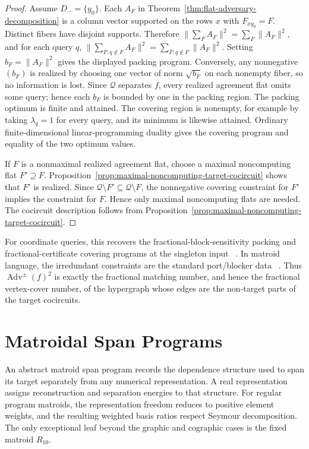\documentclass[11pt]{article}
\numberwithin{equation}{section}
\theoremstyle{remark}
\begin{document}
\begin{proof}
Assume \(D_-=\{y_0\}\).  Each \(A_F\) in
Theorem~\ref{thm:flat-adversary-decomposition} is a column vector supported
on the rows \(x\) with \(F_{x y_0}=F\).  Distinct fibers have disjoint supports. Therefore $\|\sum_FA_F\|^2=\sum_F\|A_F\|^2$, and for each query $q$, $\|\sum_{F:q\notin F}A_F\|^2=\sum_{F:q\notin F}\|A_F\|^2$. Setting $b_F=\|A_F\|^2$ gives the displayed packing program.  Conversely,
any nonnegative $(b_F)$ is realized by choosing one vector of norm
$\sqrt{b_F}$ on each nonempty fiber, so no information is lost.  Since
$\mathcal Q$ separates $f$, every realized agreement flat omits some query;
hence each $b_F$ is bounded by one in the packing region.  The packing optimum
is finite and attained.  The covering region is nonempty, for
example by taking $\lambda_q=1$ for every query, and its minimum is likewise
attained.  Ordinary finite-dimensional linear-programming duality gives the
covering program and equality of the two optimum values.

If \(F\) is a nonmaximal realized agreement flat, choose a maximal
noncomputing flat \(F'\supseteq F\).  Proposition~\ref{prop:maximal-noncomputing-target-cocircuit}
shows that \(F'\) is realized.  Since
\(\mathcal Q\setminus F'\subseteq\mathcal Q\setminus F\), the nonnegative
covering constraint for \(F'\) implies the constraint for \(F\).  Hence only
maximal noncomputing flats are needed.  The cocircuit description follows
from Proposition~\ref{prop:maximal-noncomputing-target-cocircuit}.
\end{proof}

For coordinate queries, this recovers the fractional-block-sensitivity
packing and fractional-certificate covering programs at the singleton input
~\cite{KulkarniTal2016}. In matroid language, the irredundant constraints are
the standard port/blocker data
~\cite{Seymour1977Ports,ChenDingZang2008}. Thus
\(\operatorname{Adv}^{\pm}(f)^2\) is exactly the fractional matching
number, and hence the fractional vertex-cover number, of the hypergraph whose
edges are the non-target parts of the target cocircuits.


\part{Matroidal Span Programs}

An abstract matroid span program records the dependence structure used to
span its target separately from any numerical representation. A real
representation assigns reconstruction and separation energies to that
structure. For regular program matroids, the representation freedom reduces
to positive element weights, and the resulting weighted basis ratios respect
Seymour decomposition. The only exceptional leaf beyond the graphic and
cographic cases is the fixed matroid $R_{10}$.
\end{document}
